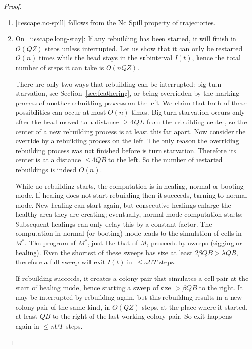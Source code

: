 \documentclass[11pt]{memoir}
\theoremstyle{definition} %
\renewcommand{\le}{\leq}
\renewcommand{\ge}{\geq}
\def\B{B}
\def\U{U}
\newcommand{\Q}{Q} %
\newcommand{\Tu}{T}
\newcommand{\Z}{Z} %
\begin{document}
\begin{proof}
  \begin{enumerate}
  \item 
  \eqref{i:escape.no-spill} follows from the No Spill property of trajectories.
\item\label{i:escape.inside-hole.long-stay} On~\eqref{i:escape.long-stay}:
  If any rebuilding has been started, it will finish in \( O(\Q\Z) \) steps unless
  interrupted.
  Let us show that it can only be restarted \( O(n) \) times while the head stays in
  the subinterval \( I(t) \), hence the total number of steps it can take is \( O(n\Q\Z) \).

  There are only two ways that rebuilding can be interrupted: big turn starvation,
  see Section~\ref{sec:feathering}, or being overridden by the marking process of another
  rebuilding process on the left.
  We claim that both of these possibilities can occur at most \( O(n) \) times.
  Big turn starvation occurs only after the head moved to a distance \( \ge 4\Q\B \) from
  the rebuilding center, so the center of a new rebuilding process is at least this far apart.
  Now consider the override by a rebuilding process on the left.
  The only reason the overriding rebuilding process was not finished before is
  turn starvation.
  Therefore its center is at a distance \( \le 4\Q\B \) to the left.
  So the number of restarted rebuildings is indeed \( O(n) \).

  While no rebuilding starts, the computation is in healing, normal or booting mode.
  If healing does not start rebuilding then it succeeds, turning to normal mode.
  New healing can start again, but consecutive healings enlarge the healthy area
  they are creating; eventually, normal mode computation starts;
  Subsequent healings can only delay this by a constant factor.
  The computation in normal (or booting) mode leads to the simulation of cells in \( M^{*} \).
  The program of \( M^{*} \), just like that of \( M \), proceeds by sweeps (zigging or healing).
  Even the shortest of these sweeps
  has size at least \( 2\beta\Q\B >\lambda\Q\B \), therefore a full sweep
  will exit \( I(t) \) in \( \le n\U\Tu \) steps.

  If rebuilding succeeds, it creates a colony-pair that simulates a cell-pair at the start of
  healing mode, hence starting a sweep of size \( >\beta\Q\B \) to the right.
  It may be interrupted by rebuilding again, but this rebuilding
  results in a new colony-pair of the same kind, in \( O(\Q\Z) \) steps, at the place
  where it started, at least \( \Q\B \) to the right of the last working colony-pair.
  So exit happens again in \( \le n\U\Tu \) steps.
    \end{enumerate}
  \end{proof}
\end{document}
